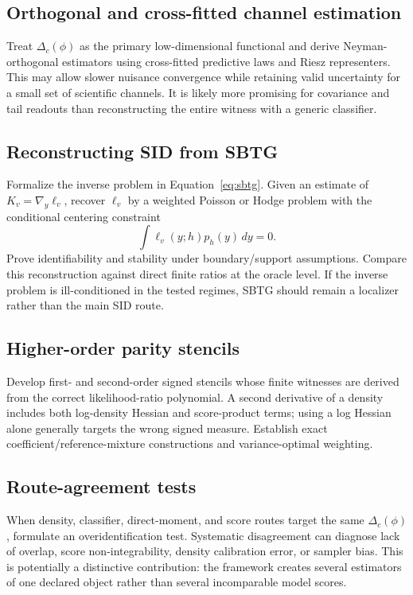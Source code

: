 \documentclass[10pt]{article}
\begin{document}
\subsection{Orthogonal and cross-fitted channel estimation}

Treat \(\Delta_c(\phi)\) as the primary low-dimensional functional and derive Neyman-orthogonal estimators using cross-fitted predictive laws and Riesz representers. This may allow slower nuisance convergence while retaining valid uncertainty for a small set of scientific channels. It is likely more promising for covariance and tail readouts than reconstructing the entire witness with a generic classifier.

\subsection{Reconstructing SID from SBTG}

Formalize the inverse problem in Equation~\eqref{eq:sbtg}. Given an estimate of \(K_v=\nabla_y\ell_v\), recover \(\ell_v\) by a weighted Poisson or Hodge problem with the conditional centering constraint
\[
  \int \ell_v(y;h)p_h(y)\,dy=0.
\]
Prove identifiability and stability under boundary/support assumptions. Compare this reconstruction against direct finite ratios at the oracle level. If the inverse problem is ill-conditioned in the tested regimes, SBTG should remain a localizer rather than the main SID route.

\subsection{Higher-order parity stencils}

Develop first- and second-order signed stencils whose finite witnesses are derived from the correct likelihood-ratio polynomial. A second derivative of a density includes both log-density Hessian and score-product terms; using a log Hessian alone generally targets the wrong signed measure. Establish exact coefficient/reference-mixture constructions and variance-optimal weighting.

\subsection{Route-agreement tests}

When density, classifier, direct-moment, and score routes target the same \(\Delta_c(\phi)\), formulate an overidentification test. Systematic disagreement can diagnose lack of overlap, score non-integrability, density calibration error, or sampler bias. This is potentially a distinctive contribution: the framework creates several estimators of one declared object rather than several incomparable model scores.
\end{document}
